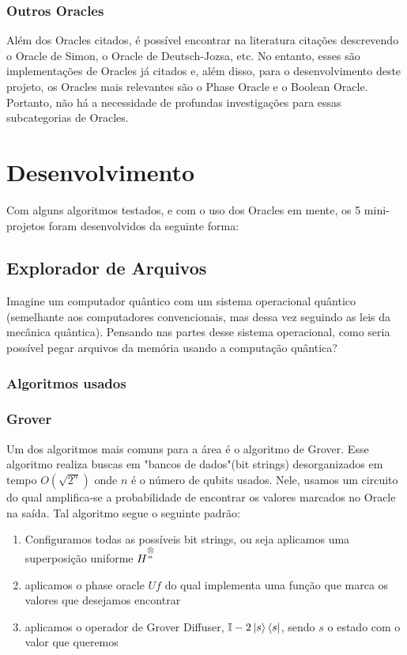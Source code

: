\documentclass{article}
\newcommand{\tens}[1]{%
	\mathbin{\mathop{\otimes}\limits_{#1}}%
}
\begin{document}
\subsubsection{Outros Oracles}

Além dos Oracles citados, é possível encontrar na literatura citações descrevendo o Oracle de Simon, o Oracle de Deutsch-Jozsa, etc. No entanto, esses são implementações de Oracles já citados e, além disso, para o desenvolvimento deste projeto, os Oracles mais relevantes são o Phase Oracle e o Boolean Oracle. Portanto, não há a necessidade de profundas investigações para essas subcategorias de Oracles.


\section{Desenvolvimento}

Com alguns algoritmos testados, e com o uso dos Oracles em mente, os 5 mini-projetos foram desenvolvidos da seguinte forma:

\subsection{Explorador de Arquivos} \label{file-explorer}

Imagine um computador quântico com um sistema operacional quântico (semelhante aos computadores convencionais, mas dessa vez seguindo as leis da mecânica quântica). Pensando nas partes desse sistema operacional, como seria possível pegar arquivos da memória usando a computação quântica?


\subsubsection{Algoritmos usados}

\subsubsection{Grover}
Um dos algoritmos mais comuns para a área é o algoritmo de Grover. Esse algoritmo realiza buscas em "bancos de dados"(bit strings) desorganizados em tempo $O(\sqrt{2^n})$ onde $n$ é o número de qubits usados. Nele, usamos um circuito do qual amplifica-se a probabilidade de encontrar os valores marcados no Oracle na saída.
Tal algoritmo segue o seguinte padrão: \
\begin{enumerate}
	\item{Configuramos todas as possíveis bit strings, ou seja aplicamos uma superposição uniforme $H^{\tens{^n}}$}
	\item{aplicamos o phase oracle $Uf$ do qual implementa uma função que marca os valores que desejamos encontrar}
	\item{aplicamos o operador de Grover Diffuser, $\mathbb{I} - 2 \mathinner{|{s}\rangle}\mathinner{\langle{s}|}$}, sendo $s$ o estado com o valor que queremos
\end{enumerate}
\end{document}
